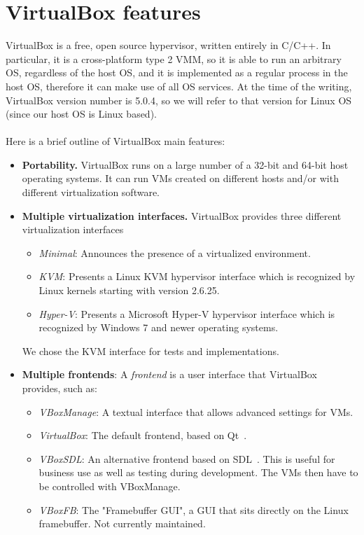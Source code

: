 \documentclass[a4paper, 12pt, titlepage]{report}
\begin{document}
\section{VirtualBox features} \label{sec:features}
VirtualBox is a free, open source hypervisor, written entirely in C/C++. In particular, it is a cross-platform type 2 VMM, so it is able to run an arbitrary OS, regardless of the host OS, and it is implemented as a regular process in the host OS, therefore it can make use of all OS services. At the time of the writing, VirtualBox version number is 5.0.4, so we will refer to that version for Linux OS (since our host OS is Linux based).
\\
\\
Here is a brief outline of VirtualBox main features:
\begin{itemize}
\item \textbf{Portability.} VirtualBox runs on a large number of a 32-bit and 64-bit host operating systems. It can run VMs created on different hosts and/or with different virtualization software.
\item \textbf{Multiple virtualization interfaces.} VirtualBox provides three different virtualization interfaces
	\begin{itemize}
	\item \textit{Minimal}: Announces the presence of a virtualized environment.
	\item \textit{KVM}: Presents a Linux KVM hypervisor interface which is recognized by Linux kernels starting with version 2.6.25.
	\item \textit{Hyper-V}: Presents a Microsoft Hyper-V hypervisor interface which is recognized by Windows 7 and newer operating systems.
	\end{itemize}
We chose the KVM interface for tests and implementations.
\item \textbf{Multiple frontends}: A \textit{frontend} is a user interface that VirtualBox provides, such as:
	\begin{itemize}
	\item \textit{VBoxManage}: A textual interface that allows advanced settings for VMs.
	\item \textit{VirtualBox}: The default frontend, based on Qt~\cite{qt}.
	\item \textit{VBoxSDL}: An alternative frontend based on SDL~\cite{sdl}. This is useful for business use as well as testing  during development. The VMs then have to be controlled with VBoxManage.
	\item \textit{VBoxFB}: The "Framebuffer GUI", a GUI that sits directly on the Linux framebuffer. Not currently maintained.

\end{itemize}
\end{itemize}
\end{document}
